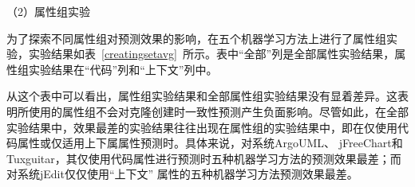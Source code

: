 
（2）属性组实验

为了探索不同属性组对预测效果的影响，在五个机器学习方法上进行了属性组实验，实验结果如表~\ref{creatingsetavg}~所示。表中“全部”列是全部属性实验结果，属性组实验结果在“代码”列和“上下文”列中。

从这个表中可以看出，属性组实验结果和全部属性组实验结果没有显着差异。这表明所使用的属性组不会对克隆创建时一致性预测产生负面影响。尽管如此，在全部实验结果中，效果最差的实验结果往往出现在属性组的实验结果中，即在仅使用代码属性或仅适用上下属属性预测时。具体来说，对系统ArgoUML、 jFreeChart和 Tuxguitar，其仅使用代码属性进行预测时五种机器学习方法的预测效果最差；而对系统jEdit仅仅使用“上下文” 属性的五种机器学习方法预测效果最差。

